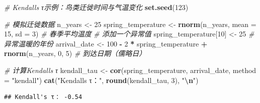 \documentclass[
  twoside,12pt,fontset=none]{ctexbook}
\newenvironment{Shaded}{\begin{snugshade}}{\end{snugshade}}
\newcommand{\AttributeTok}[1]{\textcolor[rgb]{0.13,0.29,0.53}{#1}}
\newcommand{\CommentTok}[1]{\textcolor[rgb]{0.56,0.35,0.01}{\textit{#1}}}
\newcommand{\DecValTok}[1]{\textcolor[rgb]{0.00,0.00,0.81}{#1}}
\newcommand{\FunctionTok}[1]{\textcolor[rgb]{0.13,0.29,0.53}{\textbf{#1}}}
\newcommand{\NormalTok}[1]{#1}
\newcommand{\OtherTok}[1]{\textcolor[rgb]{0.56,0.35,0.01}{#1}}
\newcommand{\SpecialCharTok}[1]{\textcolor[rgb]{0.81,0.36,0.00}{\textbf{#1}}}
\newcommand{\StringTok}[1]{\textcolor[rgb]{0.31,0.60,0.02}{#1}}
\begin{document}
\begin{Shaded}
\begin{Highlighting}[]
\CommentTok{\# Kendall\textquotesingle{}s τ示例：鸟类迁徙时间与气温变化}
\FunctionTok{set.seed}\NormalTok{(}\DecValTok{123}\NormalTok{)}

\CommentTok{\# 模拟迁徙数据}
\NormalTok{n\_years }\OtherTok{\textless{}{-}} \DecValTok{25}
\NormalTok{spring\_temperature }\OtherTok{\textless{}{-}} \FunctionTok{rnorm}\NormalTok{(n\_years, }\AttributeTok{mean =} \DecValTok{15}\NormalTok{, }\AttributeTok{sd =} \DecValTok{3}\NormalTok{) }\CommentTok{\# 春季平均温度}
\CommentTok{\# 添加一个异常值}
\NormalTok{spring\_temperature[}\DecValTok{10}\NormalTok{] }\OtherTok{\textless{}{-}} \DecValTok{25} \CommentTok{\# 异常温暖的年份}
\NormalTok{arrival\_date }\OtherTok{\textless{}{-}} \DecValTok{100} \SpecialCharTok{{-}} \DecValTok{2} \SpecialCharTok{*}\NormalTok{ spring\_temperature }\SpecialCharTok{+} \FunctionTok{rnorm}\NormalTok{(n\_years, }\DecValTok{0}\NormalTok{, }\DecValTok{5}\NormalTok{) }\CommentTok{\# 到达日期（儒略日）}

\CommentTok{\# 计算Kendall\textquotesingle{}s τ}
\NormalTok{kendall\_tau }\OtherTok{\textless{}{-}} \FunctionTok{cor}\NormalTok{(spring\_temperature, arrival\_date, }\AttributeTok{method =} \StringTok{"kendall"}\NormalTok{)}
\FunctionTok{cat}\NormalTok{(}\StringTok{"Kendall\textquotesingle{}s τ："}\NormalTok{, }\FunctionTok{round}\NormalTok{(kendall\_tau, }\DecValTok{3}\NormalTok{), }\StringTok{"}\SpecialCharTok{\textbackslash{}n}\StringTok{"}\NormalTok{)}
\end{Highlighting}
\end{Shaded}

\begin{verbatim}
## Kendall's τ： -0.54
\end{verbatim}
\end{document}
